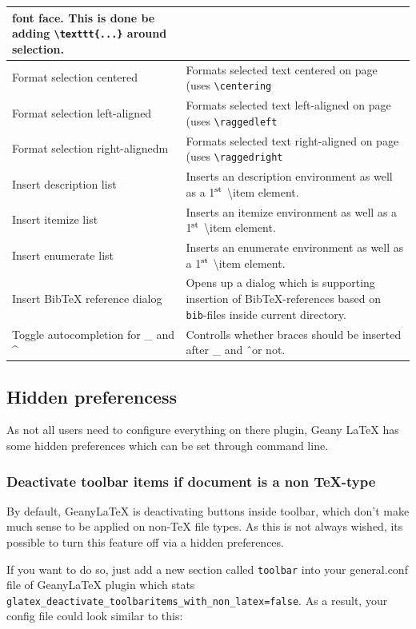 \documentclass[%
paper=a4,%
fontsize=11pt,%
twoside=false,%
DIV18,%
headsepline,%
plainheadsepline,%
footsepline,%
plainfootsepline,%
bibliography=totoc,%
listof=totoc,%
BCOR10mm,%
parskip=half,%
openany,%
]{scrartcl}
\newcommand{\up}[1]{\ensuremath{^\textrm{\scriptsize#1}}}
\begin{document}
\begin{table}[H]
\begin{tabular}{l|p{9cm}}
font face. This is done be adding \texttt{\textbackslash texttt\{...\}} around
selection.\\\hline
Format selection centered & Formats selected text centered on page (uses \texttt{\textbackslash{}centering} \\\hline
Format selection left-aligned & Formats selected text left-aligned on page (uses \texttt{\textbackslash{}raggedleft} \\\hline
Format selection right-alignedm & Formats selected text right-aligned on page (uses \texttt{\textbackslash{}raggedright}\\\hline
Insert description list & Inserts an description environment as well as a 1\up{st} \textbackslash{}item element.\\\hline
Insert itemize list & Inserts an itemize environment as well as a 1\up{st} \textbackslash{}item element.\\\hline
Insert enumerate list & Inserts an enumerate environment as well as a 1\up{st} \textbackslash{}item element.\\\hline
Insert BibTeX reference dialog & Opens up a dialog which is supporting insertion of BibTeX-references based on \texttt{bib}-files inside current directory.\\\hline
Toggle autocompletion for \_ and \^ & Controlls whether braces should be inserted after \_ and \^ \ or not.
\end{tabular}
\end{table}


\subsection{Hidden preferencess}
\label{sec:hidden_preferences}
As not all users need to configure everything on there plugin, Geany
\LaTeX{} has some hidden preferences which can be set through
command line.

\subsubsection{Deactivate toolbar items if document is a non \TeX-type}
\label{deactivate_toolbaritems_with_non_latex}
By default, Geany\LaTeX{} is deactivating buttons inside toolbar, which
don't make much sense to be applied on non-\TeX{} file types. As
this is not always wished, its possible to turn this feature off
via a hidden preferences.

If you want to do so, just add a new section called \texttt{toolbar}
into your general.conf file of Geany\LaTeX{} plugin which stats
\texttt{glatex\_deactivate\_toolbaritems\_with\_non\_latex=false}.
As a result, your config file could look similar to this:
\end{document}
